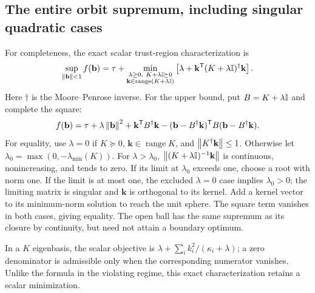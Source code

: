 \subsection{The entire orbit supremum, including singular quadratic cases}
For completeness, the exact scalar trust-region characterization is
\begin{equation}\label{eq:trustregion}
\sup_{\left\lVert\mathbf b\right\rVert<1}f(\mathbf b)=\tau+
\min_{\substack{\lambda\geq0,\ K+\lambda\mathbb I\succeq0\\
\mathbf k\in\operatorname{range}(K+\lambda\mathbb I)}}
\left[\lambda+\mathbf k^{\mathsf T}(K+\lambda\mathbb I)^\dagger\mathbf k\right].
\end{equation}
Here $\dagger$ is the Moore--Penrose inverse. For the upper bound, put
$B=K+\lambda\mathbb I$ and complete the square:
\[
f(\mathbf b)=\tau+\lambda\left\lVert\mathbf b\right\rVert^2+\mathbf k^{\mathsf T}B^\dagger\mathbf k
-(\mathbf b-B^\dagger\mathbf k)^{\mathsf T}B(\mathbf b-B^\dagger\mathbf k).
\]
For equality, use $\lambda=0$ if $K\succeq0$,
$\mathbf k\in\operatorname{range}K$, and $\left\lVert K^\dagger\mathbf k\right\rVert\leq1$.
Otherwise let $\lambda_0=\max(0,-\lambda_{\min}(K))$. For
$\lambda>\lambda_0$, $\left\lVert(K+\lambda\mathbb I)^{-1}\mathbf k\right\rVert$ is continuous,
nonincreasing, and tends to zero. If its limit at $\lambda_0$ exceeds one,
choose a root with norm one. If the limit is at most one, the excluded
$\lambda=0$ case implies $\lambda_0>0$; the limiting matrix is singular
and $\mathbf k$ is orthogonal to its kernel. Add a kernel vector to its
minimum-norm solution to reach the unit sphere. The square term vanishes in
both cases, giving equality. The open ball has the same supremum as its
closure by continuity, but need not attain a boundary optimum.

In a $K$ eigenbasis, the scalar objective is
$\lambda+\sum_i k_i^2/(\kappa_i+\lambda)$; a zero denominator is admissible
only when the corresponding numerator vanishes. Unlike the formula in the
violating regime, this exact characterization retains a scalar minimization.
